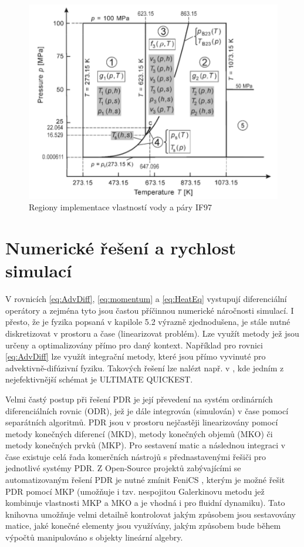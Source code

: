 \begin{figure}[h] \centering \capstart
  \includegraphics[scale=0.7]{figures/IF97}
  \caption{Regiony implementace vlastností vody a páry IF97 }
  \label{fig:IF97}
\end{figure}

\section{Numerické řešení a rychlost simulací}

V rovnicích \ref{eq:AdvDiff}, \ref{eq:momentum} a \ref{eq:HeatEq} vystupují 
diferenciální operátory a zejména tyto jsou častou příčinnou numerické 
náročnosti simulací. I přesto, že je fyzika popsaná v kapilole 5.2 výrazně 
zjednodušena, je stále nutné diskretizovat v prostoru a čase (linearizovat 
problém). Lze využít metody jež jsou určeny a optimalizovány přímo pro daný 
kontext. Například pro rovnici \ref{eq:AdvDiff} lze využít integrační metody, 
které jsou přímo vyvinuté pro advektivně-difúzivní fyziku. Takových řešení lze 
nalézt např. v , kde jedním z nejefektivnější schémat je
ULTIMATE QUICKEST. 

Velmi častý postup při řešení PDR je její převedení na systém ordinárních 
diferenciálních rovnic (ODR), jež je dále integrován (simulován) v čase pomocí 
separátních algoritmů. PDR jsou v prostoru nejčastěji linearizovány pomocí 
metody konečných diferencí (MKD), metody konečných objemů (MKO) či metody 
konečných prvků (MKP). Pro sestavení matic a následnou integraci v čase
existuje celá řada komerčních nástrojů s přednastavenými řešiči pro jednotlivé
systémy PDR. Z Open-Source projektů zabývajícími se automatizovaným řešení PDR
je nutné zmínit FeniCS , kterým je možné řešit PDR pomocí MKP 
(umožňuje i tzv. nespojitou Galerkinovu metodu jež kombinuje vlastnosti MKP a 
MKO a je vhodná i pro fluidní dynamiku). Tato knihovna umožňuje velmi detailně
kontrolovat jakým způsobem jsou sestavovány matice, jaké konečné elementy jsou
využívány, jakým způsobem bude během výpočtů manipulováno s objekty lineární
algebry.

